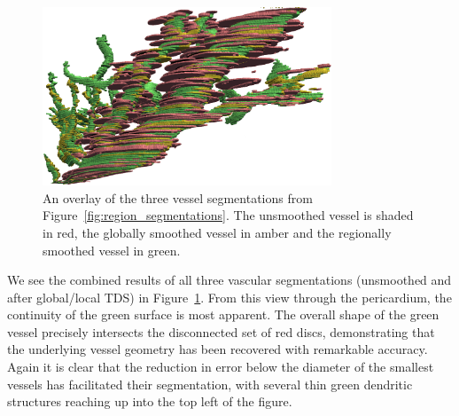   \begin{figure}[!t]
    \centering
    \includegraphics[width=3.4in]{3_results/Figs/vessel_overlay}
    \caption{An overlay of the three vessel segmentations from Figure~\ref{fig:region_segmentations}. The unsmoothed vessel is shaded in red, the globally smoothed vessel in amber and the regionally smoothed vessel in green.}
    \label{fig:vessel_segmentations}
  \end{figure} 
      We see the combined results of all three vascular segmentations (unsmoothed and after global/local TDS) in Figure~\ref{fig:vessel_segmentations}. From this view through the pericardium, the continuity of the green surface is most apparent. The overall shape of the green vessel precisely intersects the disconnected set of red discs, demonstrating that the underlying vessel geometry has been recovered with remarkable accuracy. Again it is clear that the reduction in error below the diameter of the smallest vessels has facilitated their segmentation, with several thin green dendritic structures reaching up into the top left of the figure.  
